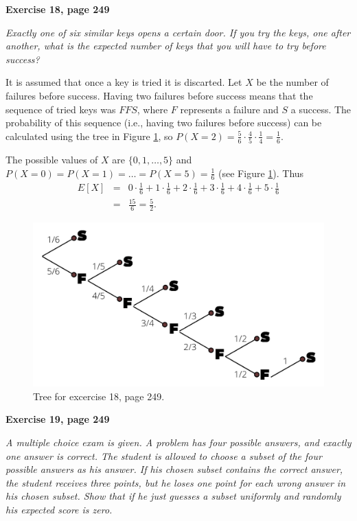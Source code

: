 \documentclass[12pt]{article}
\begin{document}
	{\bf Exercise 18, page 249}
	
	{\em Exactly one of six similar keys opens a certain door. If you try the keys, one after another, what is the expected number of keys that you will have to try before success?}
	
	It is assumed that once a key is tried it is discarted. Let $X$ be the number of failures before success. Having two failures before success means that the sequence of tried keys was $FFS$, where $F$ represents a failure and $S$ a success. The probability of this sequence (i.e., having two failures before success) can be calculated using the tree in Figure \ref{keys}, so $P(X=2) = \frac{5}{6} \cdot \frac{4}{5} \cdot \frac{1}{4} = \frac{1}{6}$. 
	
	The possible values of $X$ are $\{0, 1, \ldots, 5\}$ and $P(X = 0) = P(X = 1) = \ldots = P(X = 5) = \frac{1}{6}$ (see Figure \ref{keys}). Thus
	\begin{eqnarray*}
	E[X] &=& 0 \cdot \frac{1}{6} + 1 \cdot \frac{1}{6} + 2 \cdot \frac{1}{6} + 3 \cdot \frac{1}{6} + 4 \cdot \frac{1}{6} + 5 \cdot \frac{1}{6} \\
	&=& \frac{15}{6} = \frac{5}{2}.
	\end{eqnarray*}

	\begin{figure}
	\centering
	\includegraphics[scale=0.2]{exercise_keys.png}	
	\caption{Tree for excercise 18, page 249.}
	\label{keys}
	\end{figure}
	
	{\bf Exercise 19, page 249}
	
	{\em A multiple choice exam is given. A problem has four possible answers, and exactly one answer is correct. The student is allowed to choose a subset of the four possible answers as his answer. If his chosen subset contains the correct answer, the student receives three points, but he loses one point for each wrong answer in his chosen subset. Show that if he just guesses a subset uniformly and randomly his expected score is zero.}
	
\end{document}

